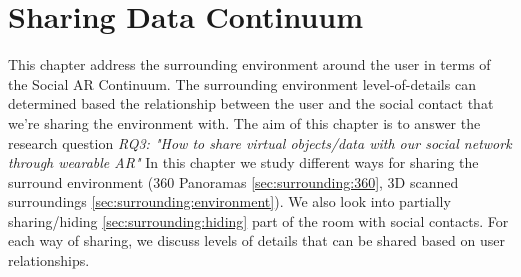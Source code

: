\chapter{Sharing Data Continuum} %
\label{ch:data} %

This chapter address the surrounding environment around the user in terms of the Social AR Continuum. The surrounding environment level-of-details can determined based the relationship between the user and the social contact that we're sharing the environment with. 
The aim of this chapter is to answer the research question \textit{RQ3: "How to share virtual objects/data with our social network through wearable AR"}
In this chapter we study different ways for sharing the surround environment (360 Panoramas \ref{sec:surrounding:360}, 3D scanned surroundings \ref{sec:surrounding:environment}). We also look into partially sharing/hiding \ref{sec:surrounding:hiding} part of the room with social contacts. For each way of sharing, we discuss levels of details that can be shared based on user relationships. 





